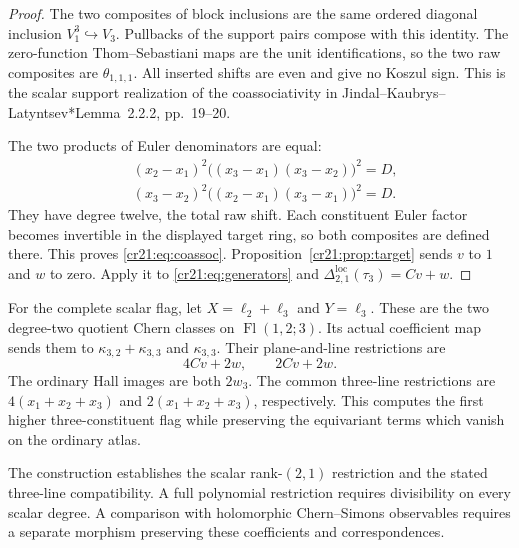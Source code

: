 \begin{proof}
The two composites of block inclusions are the same ordered diagonal
inclusion $V_1^3\hookrightarrow V_3$.
Pullbacks of the support pairs compose with this identity.
The zero-function Thom--Sebastiani maps are the unit identifications,
so the two raw composites are $\theta_{1,1,1}$.
All inserted shifts are even and give no Koszul sign.
This is the scalar support realization of the coassociativity in
Jindal--Kaubrys--Latyntsev\cite{cr11JKL}*{Lemma~2.2.2, pp.~19--20}.

The two products of Euler denominators are equal:
\[
 \begin{aligned}
 &(x_2-x_1)^2
       \bigl((x_3-x_1)(x_3-x_2)\bigr)^2=D,\\
 &(x_3-x_2)^2
       \bigl((x_2-x_1)(x_3-x_1)\bigr)^2=D.
 \end{aligned}
\]
They have degree twelve, the total raw shift.
Each constituent Euler factor becomes invertible in the displayed
target ring, so both composites are defined there.
This proves \eqref{cr21:eq:coassoc}.
Proposition~\ref{cr21:prop:target} sends $v$ to $1$ and $w$ to zero.
Apply it to \eqref{cr21:eq:generators} and
$\Delta_{2,1}^{\mathrm{loc}}(\tau_3)=Cv+w$.
\end{proof}

For the complete scalar flag, let
$X=\ell_2+\ell_3$ and $Y=\ell_3$.
These are the two degree-two quotient Chern classes on
$\operatorname{Fl}(1,2;3)$.
Its actual coefficient map sends them to
$\kappa_{3,2}+\kappa_{3,3}$ and $\kappa_{3,3}$.
Their plane-and-line restrictions are
\[
 4Cv+2w,\qquad 2Cv+2w.
\]
The ordinary Hall images are both $2w_3$.
The common three-line restrictions are $4(x_1+x_2+x_3)$ and
$2(x_1+x_2+x_3)$, respectively.
This computes the first higher three-constituent flag while preserving
the equivariant terms which vanish on the ordinary atlas.

The construction establishes the scalar rank-$(2,1)$ restriction and
the stated three-line compatibility.
A full polynomial restriction requires divisibility on every scalar degree.
A comparison with holomorphic Chern--Simons observables requires a
separate morphism preserving these coefficients and correspondences.
